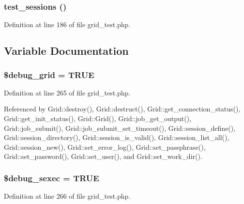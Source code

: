\subsubsection{\setlength{\rightskip}{0pt plus 5cm}test\_\-sessions ()}\label{grid__test_8php_a7}




Definition at line 186 of file grid\_\-test.php.

\subsection{Variable Documentation}
\subsubsection{\setlength{\rightskip}{0pt plus 5cm}\$debug\_\-grid = TRUE}\label{grid__test_8php_a0}




Definition at line 265 of file grid\_\-test.php.

Referenced by Grid::destroy(), Grid::destruct(), Grid::get\_\-connection\_\-status(), Grid::get\_\-init\_\-status(), Grid::Grid(), Grid::job\_\-get\_\-output(), Grid::job\_\-submit(), Grid::job\_\-submit\_\-set\_\-timeout(), Grid::session\_\-define(), Grid::session\_\-directory(), Grid::session\_\-is\_\-valid(), Grid::session\_\-list\_\-all(), Grid::session\_\-new(), Grid::set\_\-error\_\-log(), Grid::set\_\-passphrase(), Grid::set\_\-password(), Grid::set\_\-user(), and Grid::set\_\-work\_\-dir().
\subsubsection{\setlength{\rightskip}{0pt plus 5cm}\$debug\_\-sexec = TRUE}\label{grid__test_8php_a1}




Definition at line 266 of file grid\_\-test.php.